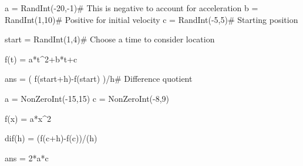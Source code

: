 \begin{sagesilent}
a = RandInt(-20,-1)# This is negative to account for acceleration
b = RandInt(1,10)# Positive for initial velocity
c = RandInt(-5,5)# Starting position

start = RandInt(1,4)# Choose a time to consider location

f(t) = a*t^2+b*t+c

ans = ( f(start+h)-f(start) )/h# Difference quotient

\end{sagesilent}


\begin{sagesilent}
a = NonZeroInt(-15,15)
c = NonZeroInt(-8,9)

f(x) = a*x^2

dif(h) = (f(c+h)-f(c))/(h)

ans = 2*a*c

\end{sagesilent}

%




%
%
%
%
%
%
%
%
%
%
%
%
%
%
%
%
%
%
%
%
%

